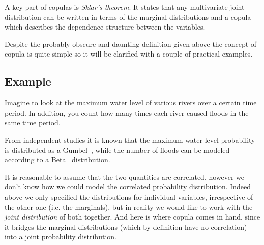 
A key part of copulas is \emph{Sklar’s theorem}. It states that any multivariate joint distribution can be written in terms of the marginal distributions and a copula which describes the dependence structure between the variables. 



Despite the probably obscure and daunting definition given above the concept of copula is quite simple so it will be clarified with a couple of practical examples.

\subsection{Example}
\label{example-problem-case}

Imagine to look at the maximum water level of various rivers over a certain time period. In addition, you count how many times each river caused floods in the same time period.

From independent studies it is known that the maximum water level probability is distributed as a Gumbel~\cite{bib:gumbel}, while the number of floods can be modeled according to a Beta~\cite{bib:beta} distribution.

It is reasonable to assume that the two quantities are  correlated, however we don't know how we could model the correlated probability distribution.
Indeed above we only specified the distributions for individual variables, irrespective of the other one (i.e. the marginals), but in reality we would like to work with the \emph{joint distribution} of both together. And here is where copula comes in hand, since it bridges the marginal distributions (which by definition have no correlation) into a joint probability distribution. 

